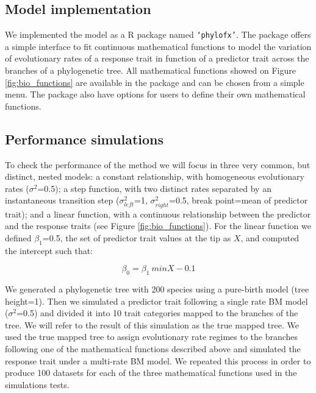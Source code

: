 \subsection{Model implementation}

We implemented the model as a R package named \texttt{`phylofx'}. The package offers a simple interface to fit continuous mathematical functions to model the variation of evolutionary rates of a response trait in function of a predictor trait across the branches of a phylogenetic tree. All mathematical functions showed on Figure \ref{fig:bio_functions} are available in the package and can be chosen from a simple menu. The package also have options for users to define their own mathematical functions.

\subsection{Performance simulations}

To check the performance of the method we will focus in three very common, but distinct, nested models: a constant relationship, with homogeneous evolutionary rates ($\sigma^{2}$=0.5); a step function, with two distinct rates separated by an instantaneous transition step ($\sigma^{2}_{left}$=1, $\sigma^{2}_{right}$=0.5, break point=mean of predictor trait); and a linear function, with a continuous relationship between the predictor and the response traits (see Figure \ref{fig:bio_functions}). For the linear function we defined $\beta_{1}$=0.5, the set of predictor trait values at the tip as $X$, and computed the intercept such that:

\begin{equation}
\beta_{0} = \beta_{1} \ min X - 0.1
\end{equation}

We generated a phylogenetic tree with 200 species using a pure-birth model (tree height=1). Then we simulated a predictor trait following a single rate BM model ($\sigma^{2}$=0.5) and divided it into 10 trait categories mapped to the branches of the tree. We will refer to the result of this simulation as the true mapped tree. We used the true mapped tree to assign evolutionary rate regimes to the branches following one of the mathematical functions described above and simulated the response trait under a multi-rate BM model. We repeated this process in order to produce 100 datasets for each of the three mathematical functions used in the simulations tests.

